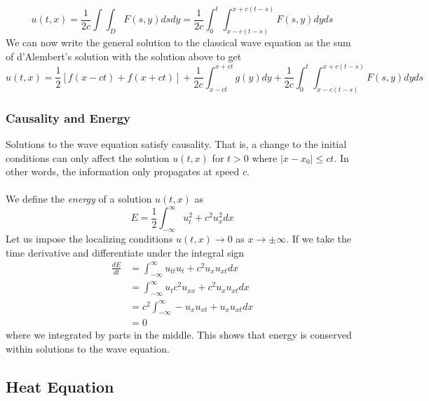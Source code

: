 \documentclass{article}
\newcommand{\od}[2]{\frac{d #1}{d #2}}
\theoremstyle{definition}
\begin{document}
\begin{equation*}
    u(t,x) = \frac{1}{2c}\int \! \! \!  \int_DF(s,y)dsdy=\frac{1}{2c}\int^t_0\int^{x+c(t-s)}_{x-c(t-s)}F(s,y)dyds
\end{equation*}
We can now write the general solution to the classical wave equation as the sum of d'Alembert's solution with the solution above to get 
\begin{equation}
    u(t,x)=\frac{1}{2}[f(x-ct)+f(x+ct)] +\frac{1}{2c}\int^{x+ct}_{x-ct}g(y)dy + \frac{1}{2c}\int^t_0\int^{x+c(t-s)}_{x-c(t-s)}F(s,y)dyds
\end{equation}

\subsubsection{Causality and Energy}
Solutions to the wave equation satisfy causality. That is, a change to the initial conditions can only affect the solution $u(t,x)$ for $t>0$ where $|x-x_0|\leq ct$. In other words, the information only propagates at speed $c$.\\\\
We define the \emph{energy} of a solution $u(t,x)$ as 
\begin{equation*}
    E=\frac{1}{2}\int^\infty_{-\infty}u_t^2+c^2u_x^2dx
\end{equation*}
Let us impose the localizing conditions $u(t,x)\rightarrow 0$ as $x\rightarrow \pm \infty$. If we take the time derivative and differentiate under the integral sign
\begin{equation*}
    \begin{split}
        \od{E}{t} &=\int^\infty_{-\infty}u_{tt}u_t+c^2u_xu_{xt}dx \\
        &=\int^\infty_{-\infty} u_tc^2u_{xx}+c^2u_xu_{xt}dx \\
        &=c^2\int^\infty_{-\infty}-u_xu_{xt}+u_xu_{xt}dx \\
        &=0
    \end{split}
\end{equation*}
where we integrated by parts in the middle. This shows that energy is conserved within solutions to the wave equation. 

\subsection{Heat Equation}
\end{document}
